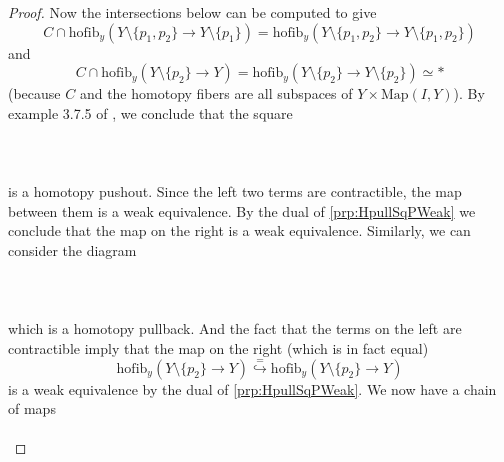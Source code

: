 \begin{prp}
\begin{proof}
Now the intersections below can be computed to give $$C\cap\text{hofib}_y(Y\setminus\{p_1,p_2\}\to Y\setminus\{p_1\})=\text{hofib}_y(Y\setminus\{p_1,p_2\}\to Y\setminus\{p_1,p_2\})$$ and $$C\cap\text{hofib}_y(Y\setminus\{p_2\}\to Y)=\text{hofib}_y(Y\setminus\{p_2\}\to Y\setminus\{p_2\})\simeq\ast$$ (because $C$ and the homotopy fibers are all subspaces of $Y\times\text{Map}(I,Y)$). By example 3.7.5 of \cite{CHT}, we conclude that the square  
 \\~\\  \\~\\
is a homotopy pushout. Since the left two terms are contractible, the map between them is a weak equivalence. By the dual of \ref{prp:HpullSqPWeak} we conclude that the map on the right is a weak equivalence. Similarly, we can consider the diagram  
 \\~\\  \\~\\
which is a homotopy pullback. And the fact that the terms on the left are contractible imply that the map on the right (which is in fact equal) $$\text{hofib}_y(Y\setminus\{p_2\}\to Y)\overset{=}{\hookrightarrow}\text{hofib}_y(Y\setminus\{p_2\}\to Y)$$ is a weak equivalence by the dual of \ref{prp:HpullSqPWeak}. We now have a chain of maps  
 \\~\\ 
\end{proof}
\end{prp}
